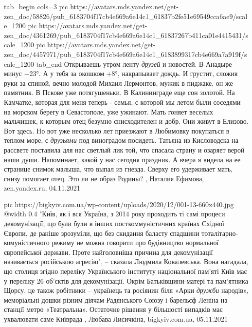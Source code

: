 \ifcmt
  tab_begin cols=3
     pic https://avatars.mds.yandex.net/get-zen_doc/58826/pub_6183704f17cb4e669a6e14c1_61837b2fe51e69549cca6ae9/scale_1200
     pic https://avatars.mds.yandex.net/get-zen_doc/4361269/pub_6183704f17cb4e669a6e14c1_61837267b411ca01e4415431/scale_1200
		 pic https://avatars.mds.yandex.net/get-zen_doc/4457971/pub_6183704f17cb4e669a6e14c1_6183899317cb4e669a7a919f/scale_1200
  tab_end
\fi
Открываешь утром ленту \emph{друзей} и новостей. В Анадыре минус −23°. А у тебя за
окошком +8°, накрапывает дождь. И грустит, сложив руки за спиной, вечно молодой
Михаил Лермонтов, мужик в пиджаке, он же памятник.  В Пскове уже потягушеньки.
В Калининграде еще сон золотой. На Камчатке, которая для меня теперь - семья, с
которой мы летом были соседями на морском берегу в Севастополе, уже ужинают.
Мать гоняет веселых мальчишек, к которым отец безумно снисходителен и добр.
Они живут в Елизово. Вот здесь.  Но вот уже несколько лет приезжают в Любимовку
покупаться в теплом море, с \emph{друзьями} под виноградом посидеть.  Татьяна
из Кисловодска на рассвете поставила для нас светлый лик той, что спасала
страну и озаряет верой наши души. Напоминает, какой у нас сегодня праздник.
А вчера я видела на ее странице снимок малыша, что выпал из гнезда.  Сверху его
удерживает мать, снизу помогает отец. Это ли не образ Родины?
, Наталия Ефимова, zen.yandex.ru, 04.11.2021

\ifcmt
  pic https://bigkyiv.com.ua/wp-content/uploads/2020/12/001-13-660x440.jpg
  @width 0.4
\fi
"Київ, як і вся Україна, з 2014 року проходить ті самі процеси декомунізації,
що були були в інших посткоммуністичних країнах Східної Європи, де раніше
зрозуміли, що без скидання баласту спадщини тоталітарно-комуністичного режиму
не можна говорити про будівництво нормальної європейської держави. Проте
найголовніша причина для декомунізації називається російською агресію", –
сказала Людмила Ковалевська.  Вона нагадала, що столиця згідно переліку
Українського інституту національної пам'яті Київ має у переліку 26 об'єктів для
декомунізації. Окрім Батьківщини-матері та пам'ятника Щорсу, це також робітники
– українець та росіянин біля «Арки \emph{дружби} народів», меморіальні дошки
різним діячам Радянського Союзу і барельєф Леніна на станції метро
«Театральна». Остаточне рішення у більшості випадків має ухвалювати саме
Київрада
, 
Любава Лисичкіна, bigkyiv.com.ua, 05.11.2021


